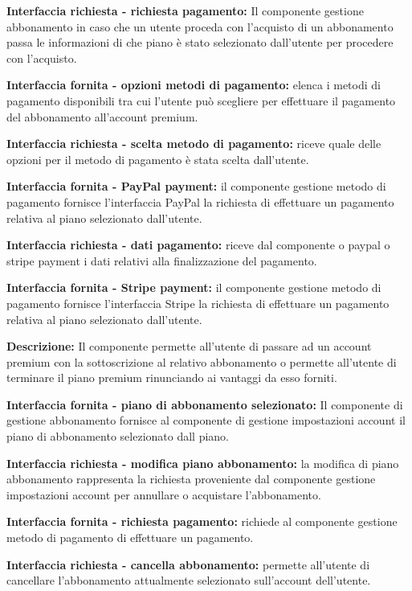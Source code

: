 \begin{listaPersonale}[DCI]{}
    \textbf{Interfaccia richiesta - richiesta pagamento:} Il componente gestione abbonamento in caso che un utente proceda con l'acquisto di un abbonamento passa le informazioni di che piano è stato selezionato dall'utente per procedere con l'acquisto.

    \textbf{Interfaccia fornita - opzioni metodi di pagamento:} elenca i metodi di pagamento disponibili tra cui l'utente può scegliere per effettuare il pagamento del abbonamento all'account premium.

    \textbf{Interfaccia richiesta - scelta metodo di pagamento:} riceve quale delle opzioni per il metodo di pagamento è stata scelta dall'utente.

    \textbf{Interfaccia fornita - PayPal payment:} il componente gestione metodo di pagamento fornisce l'interfaccia PayPal la richiesta di effettuare un pagamento relativa al piano selezionato dall'utente.

    \textbf{Interfaccia richiesta - dati pagamento:} riceve dal componente o paypal o stripe payment i dati relativi alla finalizzazione del pagamento.

    \textbf{Interfaccia fornita - Stripe payment:}  il componente gestione metodo di pagamento fornisce l'interfaccia Stripe la richiesta di effettuare un pagamento relativa al piano selezionato dall'utente.



    \textbf{Descrizione:} Il componente permette all'utente di passare ad un account premium con la sottoscrizione al relativo abbonamento o permette all'utente di terminare il piano premium rinunciando ai vantaggi da esso forniti.

    \textbf{Interfaccia fornita - piano di abbonamento selezionato:} Il componente di gestione abbonamento fornisce al componente di gestione impostazioni account il piano di abbonamento selezionato dall piano.

    \textbf{Interfaccia richiesta - modifica piano abbonamento:} la modifica di piano abbonamento rappresenta la richiesta proveniente dal componente gestione impostazioni account per annullare o acquistare l'abbonamento.

    \textbf{Interfaccia fornita - richiesta pagamento:} richiede al componente gestione metodo di pagamento di effettuare un pagamento.

    \textbf{Interfaccia richiesta - cancella abbonamento:} permette all'utente di cancellare l'abbonamento attualmente selezionato sull'account dell'utente.


\end{listaPersonale}

